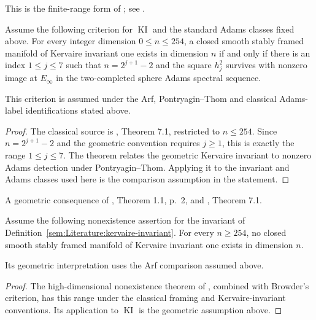 \begin{theorem}
\label{sem:Literature:finite-browder}
This is the finite-range form of \cite[Theorem 7.1, p.~178]{Browder};
see \cite[Theorem 1.3]{LWX126}.\par
Assume the following criterion for $\operatorname{KI}$ and the
standard Adams classes fixed above.
For every integer dimension $0\leq n\leq254$, a closed smooth stably framed manifold of Kervaire
invariant one exists in dimension $n$ if and only if there is an index
$1\leq j\leq7$ such that $n=2^{j+1}-2$ and the square
$h_j^2$ survives with nonzero image at $E_\infty$ in the two-completed sphere
Adams spectral sequence.

This criterion is assumed under the Arf, Pontryagin--Thom and
classical Adams-label identifications stated above.

\end{theorem}
\begin{proof}
The classical source is \cite{Browder}, Theorem 7.1, restricted to
$n\leq254$. Since $n=2^{j+1}-2$ and the geometric convention requires
$j\ge1$, this is exactly the range $1\leq j\leq7$.
The theorem relates the geometric Kervaire invariant to nonzero Adams
detection under Pontryagin--Thom. Applying it to the invariant and
Adams classes used here is the comparison assumption in the statement.
\end{proof}

\begin{theorem}
\label{sem:Literature:hhr-geometric}
A geometric consequence of \cite{HHR}, Theorem 1.1, p.~2, and \cite{Browder}, Theorem 7.1.\par
Assume the following nonexistence assertion for the invariant of
Definition~\ref{sem:Literature:kervaire-invariant}.
For every $n\geq254$, no closed smooth stably framed manifold of
Kervaire invariant one exists in dimension $n$.

Its geometric interpretation uses the Arf comparison assumed above.

\end{theorem}
\begin{proof}
The high-dimensional nonexistence theorem of \cite{HHR}, combined
with Browder's criterion, has this range under the classical framing
and Kervaire-invariant conventions. Its application to
$\operatorname{KI}$ is the geometric assumption above.
\end{proof}

